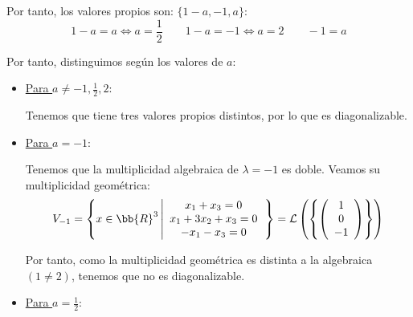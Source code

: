 \documentclass[12pt]{article}
\begin{document}
\begin{ejercicio} [6 ptos]
\begin{enumerate}
            Por tanto, los valores propios son: $\{1-a, -1, a\}$:
            \begin{equation*}
                1-a=a\Longleftrightarrow a=\frac{1}{2} 
                \qquad 1-a=-1\Longleftrightarrow a=2
                \qquad -1=a
            \end{equation*}

            Por tanto, distinguimos según los valores de $a$:
            \begin{itemize}
                \item \underline{Para $a\neq -1, \frac{1}{2}, 2$}:

                Tenemos que tiene tres valores propios distintos, por lo que es diagonalizable.

                \item \underline{Para $a=-1$}:

                Tenemos que la multiplicidad algebraica de $\lambda = -1$ es doble. Veamos su multiplicidad geométrica:
                \begin{equation*}
                    V_{-1} = \left\{x\in\bb{R}^3 \left| \begin{array}{c}
                         x_1+x_3=0  \\
                         x_1+3x_2+x_3=0 \\
                         -x_1-x_3=0
                    \end{array}\right.\right\} = \mathcal{L}\left(\left\{ \left(\begin{array}{c}
                            1 \\
                            0 \\
                            -1 \\
                       \end{array}\right)
                       \right\}\right)
                \end{equation*}

                Por tanto, como la multiplicidad geométrica es distinta a la algebraica $(1\neq 2)$, tenemos que no es diagonalizable.

                \item \underline{Para $a=\frac{1}{2}$}:


\end{itemize}
\end{enumerate}
\end{ejercicio}
\end{document}

